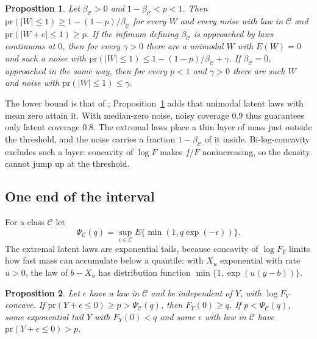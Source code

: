 \documentclass[12pt]{article}
\newtheorem{proposition}{Proposition}
\theoremstyle{definition}
\newcommand{\pr}{\mathrm{pr}}
\newcommand{\E}{\mathcal{C}}
\begin{document}
\begin{proposition}\label{prop:latentshape}
Let $\beta_{\E} > 0$ and $1 - \beta_{\E} < p < 1$. Then $\pr(|W| \le 1) \ge 1 - (1 - p)/\beta_{\E}$ for every $W$ and every noise with law in $\E$ and $\pr(|W + e| \le 1) \ge p$. If the infimum defining $\beta_{\E}$ is approached by laws continuous at $0$, then for every $\gamma > 0$ there are a unimodal $W$ with $E(W) = 0$ and such a noise with $\pr(|W| \le 1) \le 1 - (1 - p)/\beta_{\E} + \gamma$. If $\beta_{\E} = 0$, approached in the same way, then for every $p < 1$ and $\gamma > 0$ there are such $W$ and noise with $\pr(|W| \le 1) \le \gamma$.
\end{proposition}

The lower bound is that of \citet[Proposition~2.3]{guille2024}; Proposition~\ref{prop:latentshape} adds that unimodal latent laws with mean zero attain it. With median-zero noise, noisy coverage $0.9$ thus guarantees only latent coverage $0.8$. The extremal laws place a thin layer of mass just outside the threshold, and the noise carries a fraction $1 - \beta_{\E}$ of it inside. Bi-log-concavity excludes such a layer: concavity of $\log F$ makes $f/F$ nonincreasing, so the density cannot jump up at the threshold.

\subsection{One end of the interval}

For a class $\E$ let
\begin{equation}\label{eq:psi}
\Psi_{\E}(q) = \sup_{\epsilon \in \E} E\{\min(1, q \exp(-\epsilon))\}.
\end{equation}
The extremal latent laws are exponential tails, because concavity of $\log F_Y$ limits how fast mass can accumulate below a quantile: with $X_u$ exponential with rate $u > 0$, the law of $b - X_u$ has distribution function $\min\{1, \exp(u(y - b))\}$.

\begin{proposition}\label{prop:general}
Let $\epsilon$ have a law in $\E$ and be independent of $Y$, with $\log F_Y$ concave. If $\pr(Y + \epsilon \le 0) \ge p > \Psi_{\E}(q)$, then $F_Y(0) \ge q$. If $p < \Psi_{\E}(q)$, some exponential tail $Y$ with $F_Y(0) < q$ and some $\epsilon$ with law in $\E$ have $\pr(Y + \epsilon \le 0) > p$.
\end{proposition}
\end{document}
